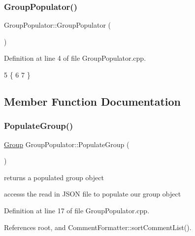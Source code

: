 \subsubsection{\texorpdfstring{Group\+Populator()}{GroupPopulator()}\hspace{0.1cm}{\footnotesize\ttfamily [2/2]}}
{\footnotesize\ttfamily Group\+Populator\+::\+Group\+Populator (\begin{DoxyParamCaption}{ }\end{DoxyParamCaption})}



Definition at line 4 of file Group\+Populator.\+cpp.


\begin{DoxyCode}
5 \{
6 
7 \}
\end{DoxyCode}


\subsection{Member Function Documentation}
\mbox{\label{class_group_populator_ae4c9f15b1d55f61497c97140df8af0b7}} 
\subsubsection{\texorpdfstring{Populate\+Group()}{PopulateGroup()}}
{\footnotesize\ttfamily \hyperlink{class_group}{Group} Group\+Populator\+::\+Populate\+Group (\begin{DoxyParamCaption}{ }\end{DoxyParamCaption})}



returns a populated group object 

access\textquotesingle{}s the read in J\+S\+ON file to populate our group object 

Definition at line 17 of file Group\+Populator.\+cpp.



References root, and Comment\+Formatter\+::sort\+Comment\+List().


